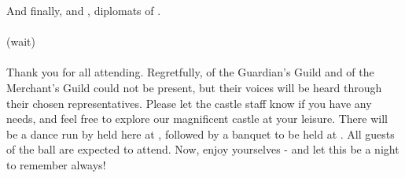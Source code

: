 \documentclass[white]{NeptuneBall}
\begin{document}
And finally, \cSpy{} and \cDiplomat{}, diplomats of \pPacifica{}.
\\ \\(wait)\\ \\
Thank you for all attending. Regretfully, \cKratos{} of the Guardian's Guild and \cNautilus{} of the Merchant's Guild could not be present, but their voices will be heard through their chosen representatives. Please let the castle staff know if you have any needs, and feel free to explore our magnificent castle at your leisure. There will be a dance run by \cPrincess{\Prince} \cPrincess{} held here at \cTOneFifty{}, followed by a banquet to be held at \cTTwo{}. All guests of the ball are expected to attend. Now, enjoy yourselves - and let this be a night to remember always!
\end{document}

